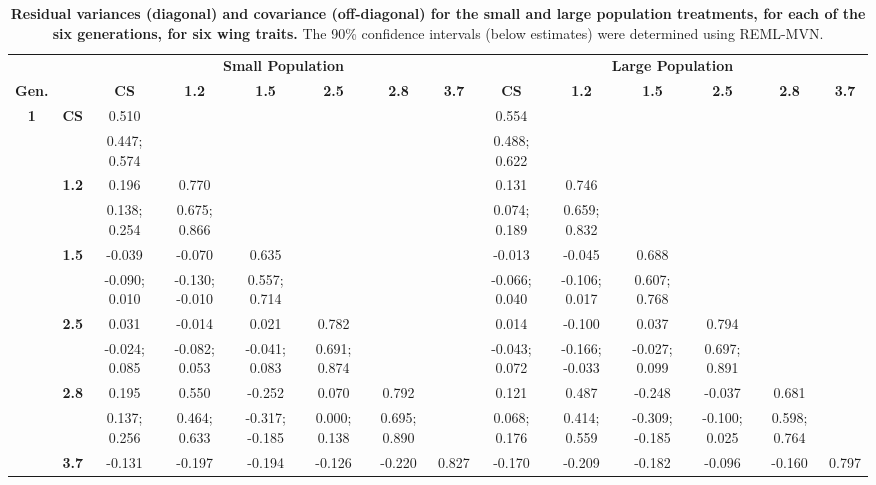 \FloatBarrier
\begin{landscape}
\begin{table}[!htp]
\renewcommand{\arraystretch}{0.8}
\scriptsize
\caption[Residual variances (diagonal) and covariance (off-diagonal) for the small and large population treatments, for each of the six generations, for six wing traits.]{\textbf{Residual variances (diagonal) and covariance (off-diagonal) for the small and large population treatments, for each of the six generations, for six wing traits.}  The 90\% confidence intervals (below estimates) were determined using REML-MVN.}
\label{tab:multi_suppRmat}
\begin{center}
\begin{tabular}{>{\bfseries}c>{\bfseries}ccccccccccccc}
\toprule
&& \multicolumn{6}{c}{\textbf{Small Population}} & \multicolumn{6}{c}{\textbf{Large Population}}\\ [1.25ex]
Gen. && \textbf{CS} & \textbf{1.2} & \textbf{1.5} & \textbf{2.5} & \textbf{2.8} & \textbf{3.7} & 
\textbf{CS} & \textbf{1.2} & \textbf{1.5} & \textbf{2.5} & \textbf{2.8} & \textbf{3.7}\\
\midrule
1 & CS & 0.510 &  &  &  &  &  & 0.554 &  &  &  &  & \\
 &  & 0.447; 0.574 &  &  &  &  &  & 0.488; 0.622 &  &  &  &  & \\[0.7ex]
 & 1.2 & 0.196 & 0.770 &  &  &  &  & 0.131 & 0.746 &  &  &  & \\
 &  & 0.138; 0.254 & 0.675; 0.866 &  &  &  &  & 0.074; 0.189 & 0.659; 0.832 &  &  &  & \\[0.7ex]
 & 1.5 & -0.039 & -0.070 & 0.635 &  &  &  & -0.013 & -0.045 & 0.688 &  &  & \\
 &  & -0.090; 0.010 & -0.130; -0.010 & 0.557; 0.714 &  &  &  & -0.066; 0.040 & -0.106; 0.017 & 0.607; 0.768 &  &  & \\[0.7ex]
 & 2.5 & 0.031 & -0.014 & 0.021 & 0.782 &  &  & 0.014 & -0.100 & 0.037 & 0.794 &  & \\
 &  & -0.024; 0.085 & -0.082; 0.053 & -0.041; 0.083 & 0.691; 0.874 &  &  & -0.043; 0.072 & -0.166; -0.033 & -0.027; 0.099 & 0.697; 0.891 &  & \\[0.7ex]
 & 2.8 & 0.195 & 0.550 & -0.252 & 0.070 & 0.792 &  & 0.121 & 0.487 & -0.248 & -0.037 & 0.681 & \\
 &  & 0.137; 0.256 & 0.464; 0.633 & -0.317; -0.185 & 0.000; 0.138 & 0.695; 0.890 &  & 0.068; 0.176 & 0.414; 0.559 & -0.309; -0.185 & -0.100; 0.025 & 0.598; 0.764 & \\[0.7ex]
 & 3.7 & -0.131 & -0.197 & -0.194 & -0.126 & -0.220 & 0.827 & -0.170 & -0.209 & -0.182 & -0.096 & -0.160 & 0.797\\

\end{tabular}
\end{center}
\end{table}
\end{landscape}
